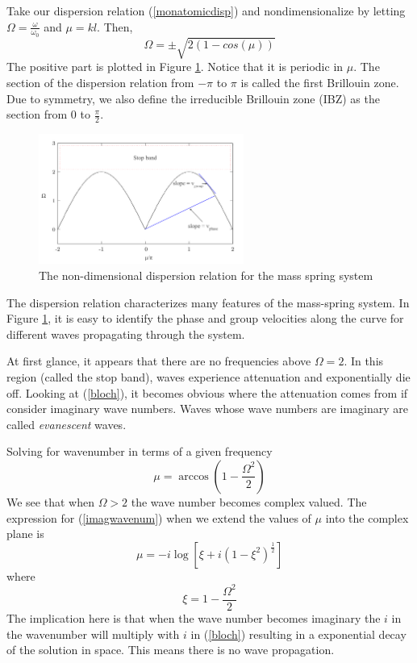 \documentclass{article}
\begin{document}
Take our dispersion relation (\ref{monatomicdisp}) and nondimensionalize by 
letting $\Omega=\frac{\omega}{\omega_0}$ and $\mu=kl$. Then,
\begin{equation}
\Omega = \pm \sqrt{2(1-cos(\mu))}
\end{equation}
The positive part is plotted in Figure \ref{fig:dr}. Notice that it is periodic 
in $\mu$. The section of the dispersion relation from $-\pi$ to $\pi$ is called 
the first Brillouin zone. Due to symmetry, we also define the irreducible 
Brillouin zone (IBZ) as the section from $0$ to $\frac{\pi}{2}$. 
\begin{figure}[!htbp]
	\centering
	\includegraphics[width=0.6\textwidth]{dispersion-rln.pdf}
	\caption{The non-dimensional dispersion relation for the mass spring system}
	\label{fig:dr}
\end{figure}
The dispersion relation characterizes many features of the mass-spring system. 
In Figure \ref{fig:dr}, it is easy to identify the phase and group velocities 
along the curve for different waves propagating through the system. 

At first glance, it appears that there are no frequencies above $\Omega = 2$. 
In this region (called the stop band), waves experience attenuation and 
exponentially die off. Looking at (\ref{bloch}), it becomes obvious where the 
attenuation comes from if consider imaginary wave numbers. Waves whose 
wave numbers are imaginary are called \emph{evanescent} waves.

Solving for wavenumber in terms of a given frequency 
\begin{equation} \label{imagwavenum}
\mu = \arccos{\left(1-\frac{\Omega^2}{2}\right)}
\end{equation}
We see that when $\Omega > 2$ the wave number becomes complex valued. The 
expression for (\ref{imagwavenum}) when we extend the values of $\mu$ into the 
complex plane is 
\begin{equation}
		\mu = -i\log \left[ \xi + i(1-\xi^2)^\frac{1}{2} \right]
\end{equation}
where
\begin{equation}
	\xi = 1-\frac{\Omega^2}{2}
\end{equation}
The implication here is that when the wave number becomes imaginary the $i$ in 
the wavenumber will multiply with $i$ in (\ref{bloch}) resulting in a 
exponential decay of the solution in space. This means there is no wave 
propagation.
\end{document}
